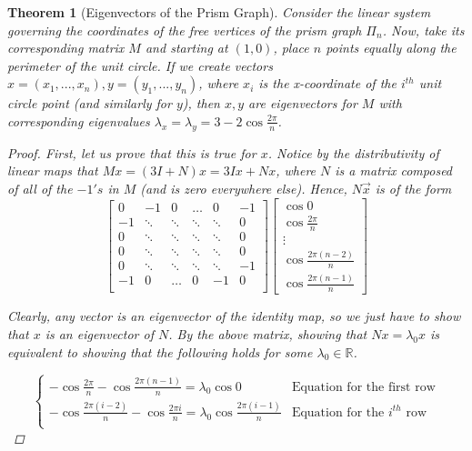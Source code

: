 \documentclass[11pt]{report}
\newtheorem{theorem}{Theorem}[section]
\begin{document}
\begin{theorem}[Eigenvectors of the Prism Graph]
    Consider the linear system governing the coordinates of the free vertices of the prism graph $\Pi_n$. Now, take its corresponding matrix $M$ and starting at $(1, 0)$, place $n$ points equally along the perimeter of the unit circle. If we create vectors $x = (x_1, ..., x_n), y = (y_1, ..., y_n)$, where $x_i$ is the x-coordinate of the $i^{th}$ unit circle point (and similarly for $y$), then $x, y$ are eigenvectors for $M$ with corresponding eigenvalues
    $\lambda_x = \lambda_y = 3 - 2 \cos{\frac{2\pi}{n}}$.
    
    \begin{proof}
        First, let us prove that this is true for $x$. Notice by the distributivity of linear maps that $Mx = (3I + N)x = 3Ix + Nx$, where $N$ is a matrix composed of all of the $-1's$ in $M$ (and is zero everywhere else). Hence, $N\vec{x}$ is of the form
        \[
        \begin{bmatrix}
        0  & -1     & 0      & \dots   & 0      & -1 \\
        -1 & \ddots & \ddots & \ddots  & \ddots & 0 \\
        0  & \ddots & \ddots & \ddots  & \ddots & 0 \\
        0  & \ddots & \ddots & \ddots  & \ddots & 0 \\
        0  & \ddots & \ddots & \ddots  & \ddots & -1 \\
        -1 & 0      & \dots  & 0       & -1     & 0 \\
        \end{bmatrix}
        \begin{bmatrix}
            \cos{0} \\ 
            \cos{\frac{2 \pi}{n}} \\
            \vdots \\
            \cos{\frac{2 \pi(n-2)}{n}} \\
            \cos{\frac{2 \pi(n-1)}{n}}
        \end{bmatrix}
        \]
        
        Clearly, any vector is an eigenvector of the identity map, so we just have to show that $x$ is an eigenvector of $N$. By the above matrix, showing that $Nx = \lambda_0 x$ is equivalent to showing that the following holds for some $\lambda_0 \in \mathbb{R}$.
        
        \[\begin{cases}
        -\cos{\frac{2 \pi}{n}} - \cos{\frac{2\pi(n-1)}{n}} = \lambda_0 \cos{0} &\text{Equation for the first row} \\
        -\cos{\frac{2 \pi (i - 2)}{n}} - \cos{\frac{2 \pi i}{n}} = \lambda_0 \cos{\frac{2\pi(i-1)}{n}}
        &\text{Equation for the $i^{th}$ row} \\
        \end{cases}\]
        

\end{proof}
\end{theorem}
\end{document}
